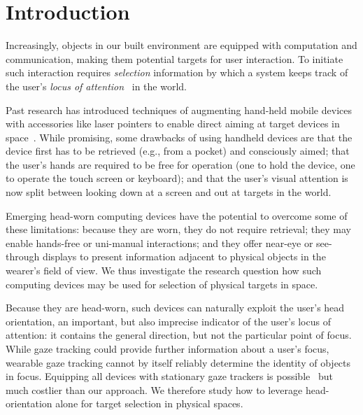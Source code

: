 \section{Introduction}

Increasingly, objects in our built environment are equipped with computation and communication, making them potential targets for user interaction. 
To initiate such interaction requires {\em selection} information by which a system keeps track of the user's {\em locus of attention}~\cite{raskin} in the world.

Past research has introduced techniques of augmenting hand-held mobile devices with accessories like laser pointers to enable direct aiming at target devices in space~\cite{beigl_point_1999,patel_2-way_2003}. While promising, some drawbacks of using handheld devices are that the device first has to be retrieved (e.g., from a pocket) and consciously aimed; that the user's hands are required to be free for operation (one to hold the device, one to operate the touch screen or keyboard); and that the user's visual attention is now split between looking down at a screen and out at targets in the world. 

Emerging head-worn computing devices have the potential to overcome some of these limitations: because they are worn, they do not require retrieval; they may enable hands-free or uni-manual interactions; and they offer near-eye or see-through displays to present information adjacent to physical objects in the wearer's field of view. We thus investigate the research question how such computing devices may be used for selection of physical targets in space.

Because they are head-worn, such devices can naturally exploit the user's head orientation, an important, but also imprecise indicator of the user's locus of attention: it contains the general direction, but not the particular point of focus. While gaze tracking could provide further information about a user's focus, wearable gaze tracking cannot by itself reliably determine the identity of objects in focus. Equipping all devices with stationary gaze trackers is possible~\cite{vertegaal2005media} but much costlier than our approach. We therefore study how to leverage head-orientation alone for target selection in physical spaces. 

